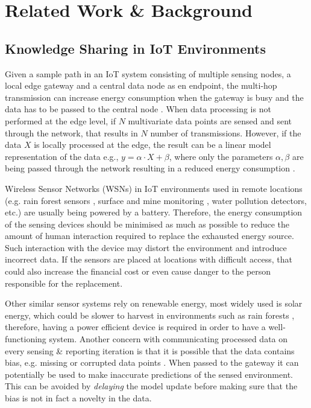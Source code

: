 \documentclass{mpaper}
\begin{document}
\section{Related Work \& Background}
\subsection{Knowledge Sharing in IoT Environments}
Given a sample path in an IoT system consisting of multiple sensing nodes, 
a local edge gateway and a central data node as en endpoint, 
the multi-hop transmission can increase energy consumption when the gateway is busy and the data has to be passed to the central node \cite{shi2016}. 
When data processing is not performed at the edge level, 
if $N$ multivariate data points are sensed and sent through the network, 
that results in $N$ number of transmissions. However, 
if the data $X$ is locally processed at the edge, the result 
can be a linear model representation of the data e.g., $y = \alpha \cdot X + \beta$, 
where only the parameters $\alpha, \beta$ are being passed through the network resulting in a reduced energy consumption \cite{tanluizhang2011}.

Wireless Sensor Networks (WSNs) in IoT environments used in remote locations (e.g. rain forest sensors  \cite{rainforests2009}, surface and mine monitoring \cite{Akkas2018}, water pollution detectors\cite{waterwsn2017}, etc.) are usually being powered by a battery. 
Therefore, the energy consumption of the sensing devices should be minimised as much as possible to reduce the amount of human interaction required to replace the exhausted energy source. 
Such interaction with the device may distort the environment and introduce incorrect data. 
If the sensors are placed at locations with difficult access, that could also increase the financial cost or even cause danger to the person responsible for the replacement.

Other similar sensor systems rely on renewable energy, most widely used is solar energy, which could be slower to harvest in environments such as rain forests \cite{rainforests2009}, 
therefore, having a power efficient device is required in order to have a well-functioning system. Another concern with communicating processed data on every sensing \& reporting iteration is that it is possible that the data contains bias, e.g. missing or corrupted data points \cite{anagnostop2016}. When passed to the gateway it can potentially be used to make inaccurate predictions of the sensed environment. This can be avoided by \textit{delaying} the model update before making sure that the bias is not in fact a novelty in the data.
\end{document}

